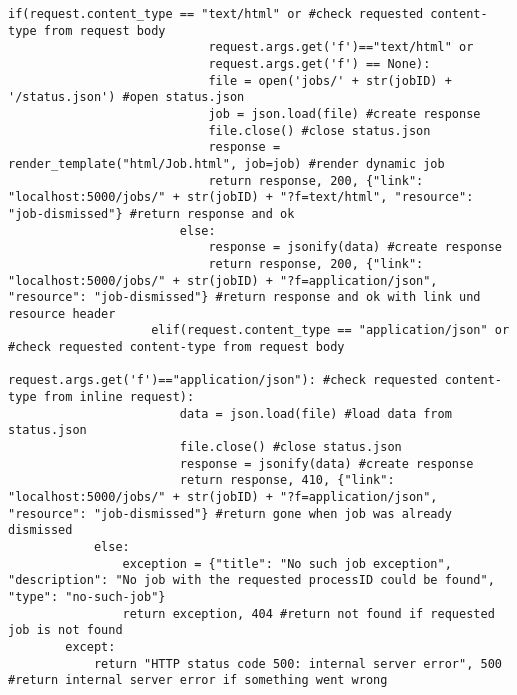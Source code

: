 \begin{lstlisting}[caption={Job Endpoint}, style = Python]
                        if(request.content_type == "text/html" or #check requested content-type from request body
                            request.args.get('f')=="text/html" or 
                            request.args.get('f') == None):
                            file = open('jobs/' + str(jobID) + '/status.json') #open status.json
                            job = json.load(file) #create response   
                            file.close() #close status.json
                            response = render_template("html/Job.html", job=job) #render dynamic job
                            return response, 200, {"link": "localhost:5000/jobs/" + str(jobID) + "?f=text/html", "resource": "job-dismissed"} #return response and ok
                        else:
                            response = jsonify(data) #create response
                            return response, 200, {"link": "localhost:5000/jobs/" + str(jobID) + "?f=application/json", "resource": "job-dismissed"} #return response and ok with link und resource header
                    elif(request.content_type == "application/json" or #check requested content-type from request body
                            request.args.get('f')=="application/json"): #check requested content-type from inline request):
                        data = json.load(file) #load data from status.json 
                        file.close() #close status.json
                        response = jsonify(data) #create response
                        return response, 410, {"link": "localhost:5000/jobs/" + str(jobID) + "?f=application/json", "resource": "job-dismissed"} #return gone when job was already dismissed
            else:
                exception = {"title": "No such job exception", "description": "No job with the requested processID could be found", "type": "no-such-job"}
                return exception, 404 #return not found if requested job is not found 
        except:            
            return "HTTP status code 500: internal server error", 500 #return internal server error if something went wrong
\end{lstlisting}\label{appendixJob}  

\newpage
